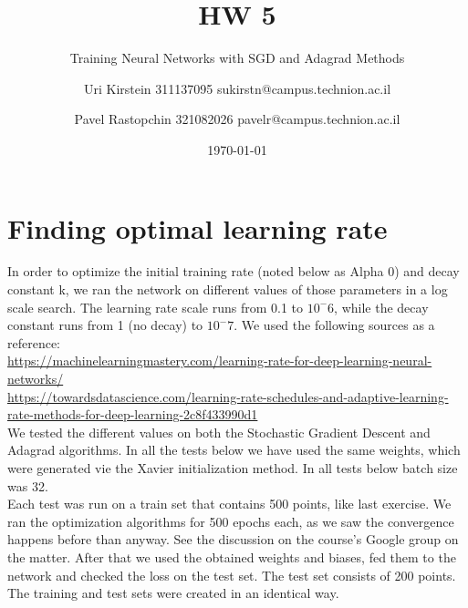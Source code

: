 \documentclass[12pt]{scrartcl}
\begin{document}

\titlehead{CS department, Technion}
\subject{Introduction to Optimization and Deep Learning 236330}
\title{HW 5}
\subtitle{Training Neural Networks with SGD and Adagrad Methods}
\author{Uri Kirstein 311137095 \hfill sukirstn@campus.technion.ac.il\and Pavel Rastopchin 321082026 pavelr@campus.technion.ac.il}
\date{\today}
\maketitle


\section{Finding optimal learning rate}

In order to optimize the initial training rate (noted below as Alpha 0) and decay constant k, we ran the network on different values of those parameters in a log scale search. The learning rate scale runs from 0.1 to $10^-6$, while the decay constant runs from 1 (no decay) to $10^-7$. We used the following sources as a reference:\\
\url{https://machinelearningmastery.com/learning-rate-for-deep-learning-neural-networks/}\\
\url{https://towardsdatascience.com/learning-rate-schedules-and-adaptive-learning-rate-methods-for-deep-learning-2c8f433990d1}\\
We tested the different values on both the Stochastic Gradient Descent and Adagrad algorithms. In all the tests below we have used the same weights, which were generated vie the Xavier initialization method. In all tests below batch size was 32.\\
Each test was run on a train set that contains 500 points, like last exercise. We ran the optimization algorithms for 500 epochs each, as we saw the convergence happens before than anyway. See the discussion on the course's Google group on the matter. After that we used the obtained weights and biases, fed them to the network and checked the loss on the test set. The test set consists of 200 points. The training and test sets were created in an identical way.


\end{document}
